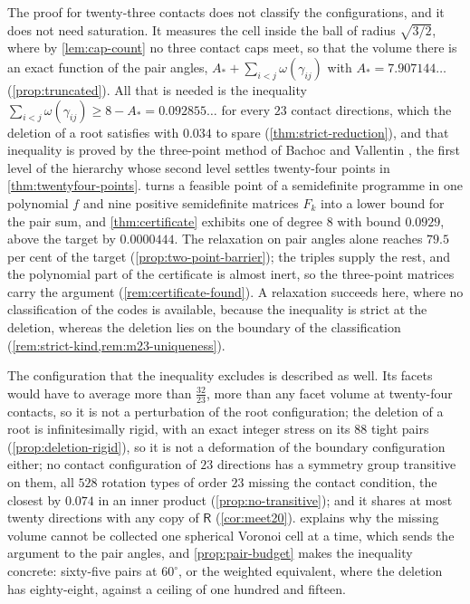 \documentclass[11pt,reqno]{amsart}
\renewcommand{\_}{\origunderscore\allowbreak}
\numberwithin{equation}{section}
\theoremstyle{plain}
\theoremstyle{definition}
\theoremstyle{remark}
\newcommand{\Rt}{\mathsf{R}}                 %
\begin{document}
The proof for twenty-three contacts does not classify the configurations,
and it does not need saturation. It measures the cell inside the ball of
radius $\sqrt{3/2}$, where by \cref{lem:cap-count} no three contact caps
meet, so that the volume there is an exact function of the pair angles,
$A_*+\sum_{i<j}\omega(\gamma_{ij})$ with $A_*=7.907144\ldots$
(\cref{prop:truncated}). All that is needed is the inequality
$\sum_{i<j}\omega(\gamma_{ij})\ge8-A_*=0.092855\ldots$ for every $23$
contact directions, which the deletion of a root satisfies with $0.034$ to
spare (\cref{thm:strict-reduction}), and that inequality is proved by the
three-point method of Bachoc and Vallentin \cite{BV08}, the first level of
the hierarchy whose second level settles twenty-four points in
\cref{thm:twentyfour-points}.  turns a feasible point
of a semidefinite programme in one polynomial $f$ and nine positive
semidefinite matrices $F_k$ into a lower bound for the pair sum, and
\cref{thm:certificate} exhibits one of degree $8$ with bound $0.0929$, above
the target by $0.0000444$. The relaxation on pair angles alone reaches
$79.5$ per cent of the target (\cref{prop:two-point-barrier}); the triples
supply the rest, and the polynomial part of the certificate is almost
inert, so the three-point matrices carry the argument
(\cref{rem:certificate-found}). A relaxation succeeds here, where no
classification of the codes is available, because the inequality is
strict at the deletion, whereas the deletion lies on the boundary of the
classification (\cref{rem:strict-kind,rem:m23-uniqueness}).

The configuration that the inequality excludes is described as well. Its
facets would have to average more than $\tfrac{32}{23}$, more than any facet
volume at twenty-four contacts, so it is not a perturbation of the root
configuration; the deletion of a root is infinitesimally rigid, with an
exact integer stress on its $88$ tight pairs (\cref{prop:deletion-rigid}),
so it is not a deformation of the boundary configuration either; no contact
configuration of $23$ directions has a symmetry group transitive on them,
all $528$ rotation types of order $23$ missing the contact condition, the
closest by $0.074$ in an inner product (\cref{prop:no-transitive}); and it
shares at most twenty directions with any copy of $\Rt$
(\cref{cor:meet20}).  explains why the missing
volume cannot be collected one spherical Voronoi cell at a time, which
sends the argument to the pair angles, and \cref{prop:pair-budget} makes the
inequality concrete: sixty-five pairs at $60^\circ$, or the weighted
equivalent, where the deletion has eighty-eight, against a ceiling of one
hundred and fifteen.
\end{document}
